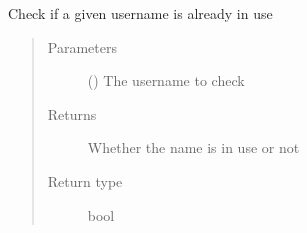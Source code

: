 \documentclass[letterpaper,10pt,english]{sphinxmanual}
\begin{document}

\begin{fulllineitems}
\label{\detokenize{db:db.checkIfUsernameFree}}
Check if a given username is already in use
\begin{quote}\begin{description}
\item[{Parameters}] \leavevmode
{} () \textendash{} The username to check

\item[{Returns}] \leavevmode
Whether the name is in use or not

\item[{Return type}] \leavevmode
bool

\end{description}\end{quote}

\end{fulllineitems}

\end{document}
